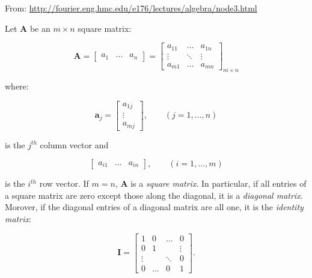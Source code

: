 \documentclass[10pt,b5paper,titlepage]{book}
\begin{document}
From: \url{http://fourier.eng.hmc.edu/e176/lectures/algebra/node3.html}

Let $\mathbf{A}$ be an $m \times n$ square matrix:

\begin{equation}
    \mathbf{A} = \begin{bmatrix} a_1 & \ldots & a_n \end{bmatrix}
    = \begin{bmatrix}
        a_{11} & \ldots & a_{1n}\\
        \vdots & \ddots & \vdots\\
        a_{m1} & \ldots & a_{mn}
    \end{bmatrix}_{m \times n}
\end{equation}

where:

\begin{equation}
    \mathbf{a}_{j} = \begin{bmatrix} a_{1j}\\ \vdots\\ a_{mj} \end{bmatrix}
    ,\qquad (j = 1, \ldots, n)
\end{equation}

is the $j^{th}$ column vector and

\begin{equation}
    \begin{bmatrix} a_{i1} & \ldots & a_{in} \end{bmatrix}
    , \qquad (i = 1, \ldots, m)
\end{equation}

is the $i^{th}$ row vector. If $m = n$, $\mathbf{A}$ is a \textit{square matrix}.
In particular, if all entries of a square matrix are zero except those along the
diagonal, it is a \textit{diagonal matrix}. Morover, if the diagonal entries of
a diagonal matrix are all one, it is the \textit{identity matrix}:

\begin{equation}
    \mathbf{I} = \begin{bmatrix}
        1 & 0 & \ldots & 0\\
        0 & 1 &   & \vdots\\
        \vdots & & \ddots & 0\\
        0 & \ldots & 0 & 1
    \end{bmatrix}
.\end{equation}
\end{document}
